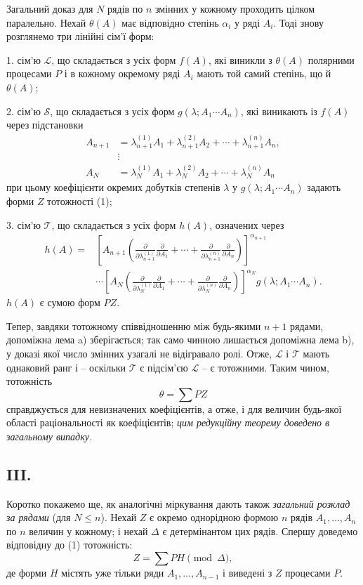 \documentclass[11pt]{article}
\providecommand{\vdotswithin}[1]{\mathrel{\vdots}}
\begin{document}
Загальний доказ для $N$ рядів по $n$ змінних у кожному проходить цілком паралельно. Нехай $\theta(A)$ має відповідно степінь $\alpha_i$ у ряді $A_i$. Тоді знову розглянемо три лінійні сім'ї форм:

1. сім'ю $\mathcal L$, що складається з усіх форм $f(A)$, які виникли з $\theta(A)$ полярними процесами $P$ і в кожному окремому ряді $A_i$ мають той самий степінь, що й $\theta(A)$;

2. сім'ю $\mathcal S$, що складається з усіх форм $g(\lambda;A_1\cdots A_n)$, які виникають із $f(A)$ через підстановки
\[
\begin{aligned}
 A_{n+1}&=\lambda_{n+1}^{(1)}A_1+\lambda_{n+1}^{(2)}A_2+
        \cdots+\lambda_{n+1}^{(n)}A_n,\\
 &\vdotswithin{=}\\
 A_N&=\lambda_N^{(1)}A_1+\lambda_N^{(2)}A_2+
        \cdots+\lambda_N^{(n)}A_n
\end{aligned}
\]
при цьому коефіцієнти окремих добутків степенів $\lambda$ у $g(\lambda;A_1\cdots A_n)$ задають форми $Z$ тотожності (1);

3. сім'ю $\mathcal T$, що складається з усіх форм $h(A)$, означених через
\[
\begin{aligned}
 h(A)=&\left[A_{n+1}\left(
 \frac{\partial}{\partial\lambda_{n+1}^{(1)}}\frac{\partial}{\partial A_1}
 +\cdots+
 \frac{\partial}{\partial\lambda_{n+1}^{(n)}}\frac{\partial}{\partial A_n}\right)\right]^{\alpha_{n+1}} \\
&\cdots
\left[A_N\left(
 \frac{\partial}{\partial\lambda_N^{(1)}}\frac{\partial}{\partial A_1}
 +\cdots+
 \frac{\partial}{\partial\lambda_N^{(n)}}\frac{\partial}{\partial A_n}\right)\right]^{\alpha_N}
 g(\lambda;A_1\cdots A_n).
\end{aligned}
\]
$h(A)$ є сумою форм $PZ$.

Тепер, завдяки тотожному співвідношенню між будь-якими $n+1$ рядами, допоміжна лема a) зберігається; так само чинною лишається допоміжна лема b), у доказі якої число змінних узагалі не відігравало ролі. Отже, $\mathcal L$ і $\mathcal T$ мають однаковий ранг і -- оскільки $\mathcal T$ є підсім'єю $\mathcal L$ -- є тотожними. Таким чином, тотожність
\[
  \theta=\sum PZ
\]
справджується для невизначених коефіцієнтів, а отже, і для величин будь-якої області раціональності як коефіцієнтів; \emph{цим редукційну теорему доведено в загальному випадку.}

\subsection*{III.}
Коротко покажемо ще, як аналогічні міркування дають також \emph{загальний розклад за рядами} (для $N\le n$). Нехай $Z$ є окремо однорідною формою $n$ рядів $A_1,\ldots,A_n$ по $n$ величин у кожному; і нехай $\Delta$ є детермінантом цих рядів. Спершу доведемо відповідну до (1) тотожність:
\begin{equation}
  Z=\sum PH \pmod{\Delta},
\tag{2}
\end{equation}
де форми $H$ містять уже тільки ряди $A_1,\ldots,A_{n-1}$ і виведені з $Z$ процесами $P$.
\end{document}
